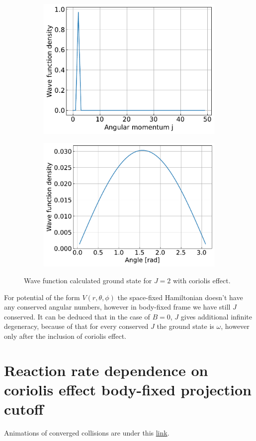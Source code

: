 \documentclass{article}
\begin{document}
\begin{figure}[H]
\begin{subfigure}{.4\linewidth}
            \includegraphics[width=\linewidth]{harmonic_iso_coriolis_angular.pdf}
        \end{subfigure}
        \begin{subfigure}{.4\linewidth}
            \centering
            \includegraphics[width=\linewidth]{harmonic_iso_coriolis_polar.pdf}
        \end{subfigure}   
        \caption{Wave function calculated ground state for $J = 2$ with coriolis effect.}
    \end{figure}

    For potential of the form $V(r, \theta, \phi)$ the space-fixed Hamiltonian doesn't have any
    conserved angular numbers, however in body-fixed frame we have still $J$ conserved.
    It can be deduced that in the case of $B = 0$, $J$ gives additional infinite degeneracy,
    because of that for every conserved $J$ the ground state is $\omega$, 
    however only after the inclusion of coriolis effect.

\section{Reaction rate dependence on coriolis effect body-fixed projection cutoff}
    Animations of converged collisions are under this \href{https://postimg.cc/gallery/nc5Gdcz}{link}.
\end{document}
